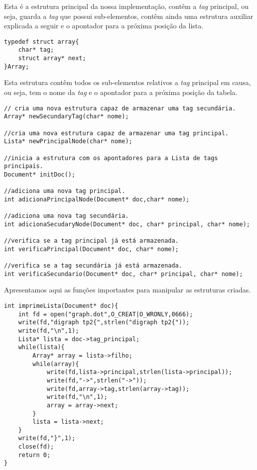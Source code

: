 \documentclass{report}
\begin{document}
    Esta é a estrutura principal da nossa implementação, contêm a \textit{tag} principal, ou seja, guarda a \textit{tag} que possui sub-elementos, contêm ainda uma estrutura auxiliar explicada a seguir e o apontador para a próxima posição da lista.
    
    

\begin{verbatim}
typedef struct array{
    char* tag;
    struct array* next;
}Array;
\end{verbatim}
    
    Esta estrutura contêm todos os sub-elementos relativos a \textit{tag} principal em causa, ou seja, tem o nome da \textit{tag} e o apontador para a próxima posição da tabela.

\begin{verbatim}
// cria uma nova estrutura capaz de armazenar uma tag secundária.
Array* newSecundaryTag(char* nome);

//cria uma nova estrutura capaz de armazenar uma tag principal.
Lista* newPrincipalNode(char* nome);

//inicia a estrutura com os apontadores para a Lista de tags principais.
Document* initDoc();

//adiciona uma nova tag principal.
int adicionaPrincipalNode(Document* doc,char* nome);

//adiciona uma nova tag secundária.
int adicionaSecudaryNode(Document* doc, char* principal, char* nome);

//verifica se a tag principal já está armazenada.
int verificaPrincipal(Document* doc, char* nome);

//verifica se a tag secundária já está armazenada.
int verificaSecundario(Document* doc, char* principal, char* nome);
\end{verbatim}

    Apresentamos aqui as funções importantes para manipular as estruturas criadas.

\begin{verbatim}
int imprimeLista(Document* doc){
    int fd = open("graph.dot",O_CREAT|O_WRONLY,0666);
    write(fd,"digraph tp2{",strlen("digraph tp2{"));
    write(fd,"\n",1);
    Lista* lista = doc->tag_principal;
    while(lista){
        Array* array = lista->filho;
        while(array){
            write(fd,lista->principal,strlen(lista->principal));
            write(fd,"->",strlen("->"));
            write(fd,array->tag,strlen(array->tag));
            write(fd,"\n",1);
            array = array->next;
        }
        lista = lista->next;
    }
    write(fd,"}",1);
    close(fd);
    return 0;
}
\end{verbatim}
    
\end{document}
